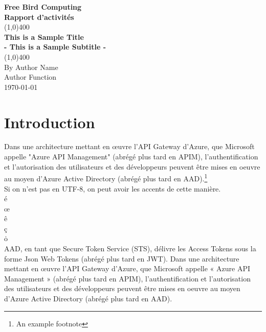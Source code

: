 \documentclass[11pt]{article}
\begin{document}
\begin{titlepage}
\begin{center}
\vspace*{1cm}
\Large{\textbf{Free Bird Computing}}\\
\Large{\textbf{Rapport d'activités}}\\
\vfill
\line(1,0){400}\\[1mm]
\huge{\textbf{This is a Sample Title}}\\[3mm]
\Large{\textbf{- This is a Sample Subtitle -}}\\[1mm]
\line(1,0){400}\\[1mm]
\vfill
By Author Name\\
Author Function\\
\today \\
\end{center}
\end{titlepage}

\tableofcontents
\thispagestyle{empty}
\clearpage

\setcounter{page}{1}

\section{Introduction}
Dans une architecture mettant en œuvre l'API Gateway d'Azure, que Microsoft appelle "Azure API Management" (abrégé plus tard en APIM), l'authentification et l'autorisation des utilisateurs et des développeurs peuvent être mises en oeuvre au moyen d'Azure Active Directory (abrégé plus tard en AAD).\footnote{An example footnote}\\

Si on n'est pas en UTF-8, on peut avoir les accents de cette manière.\\
\'e\\
\oe\\
\^e\\
\c{c}\\
\.o\\


AAD, en tant que Secure Token Service (STS), délivre les Access Tokens sous la forme Json Web Tokens (abrégé plus tard en JWT). Dans une architecture mettant en œuvre l'API Gateway d'Azure, que Microsoft appelle « Azure API Management » (abrégé plus tard en APIM), l'authentification et l'autorisation des utilisateurs et des développeurs peuvent être mises en oeuvre au moyen d'Azure Active Directory (abrégé plus tard en AAD).\\
\end{document}
